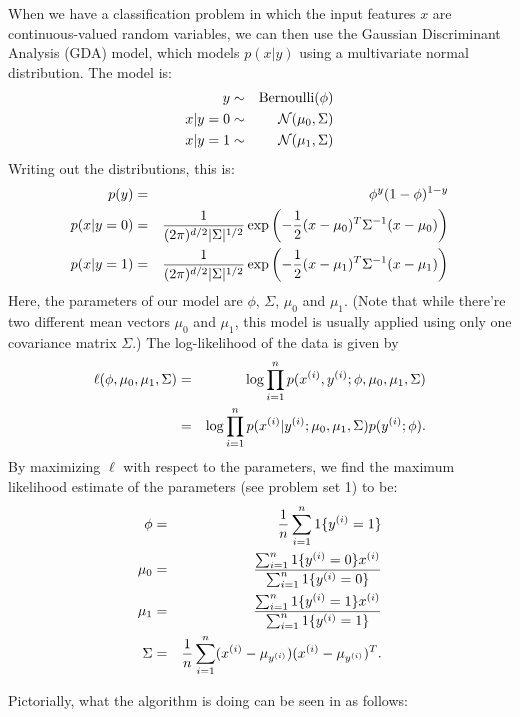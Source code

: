 \documentclass{article}
\begin{document}
When we have a classification problem in which the input features $x$ are continuous-valued
random variables, we can then use the Gaussian Discriminant Analysis (GDA) model, which
models $p(x|y)$ using a multivariate normal distribution.  The model is:
\begin{eqnarray*}
y &\sim& {\rm Bernoulli}(\phi)\\
x|y=0 &\sim& {\cal N}(\mu_0, \Sigma) \\
x|y=1 &\sim& {\cal N}(\mu_1, \Sigma) \\
\end{eqnarray*}
Writing out the distributions, this is:
\begin{eqnarray*}
p(y) &=& \phi^{y} (1-\phi)^{1-y} \\
p(x | y=0) &=& \frac{1}{(2\pi)^{{d}/2} |\Sigma|^{1/2}} \exp\left(-\frac{1}{2}
                 (x-\mu_0)^T \Sigma^{-1} (x-\mu_0) \right) \\
p(x | y=1) &=& \frac{1}{(2\pi)^{{d}/2} |\Sigma|^{1/2}} \exp\left(-\frac{1}{2}
                 (x-\mu_1)^T \Sigma^{-1} (x-\mu_1) \right) \\
\end{eqnarray*}
Here, the parameters of our model are $\phi$,
$\Sigma$, $\mu_0$ and $\mu_1$.
(Note that while there're two different mean vectors $\mu_0$ and $\mu_1$,
this model is usually applied using only one covariance matrix $\Sigma$.)
The log-likelihood of the data is given by
\begin{eqnarray*}
\ell(\phi, \mu_0, \mu_1, \Sigma) &=& \log \prod_{i=1}^{n} p(x^{(i)} , y^{(i)}; \phi, \mu_0, \mu_1, \Sigma) \\
&=& \log \prod_{i=1}^{n} p(x^{(i)} | y^{(i)}; \mu_0, \mu_1, \Sigma) p(y^{(i)}; \phi).
\end{eqnarray*}
By maximizing $\ell$ with respect to the parameters, we find the maximum likelihood
estimate of the parameters (see problem set 1) to be:
\begin{eqnarray*}
\phi &=& \frac{1}{{n}} \sum_{i=1}^{n} 1\{y^{(i)} = 1\} \\
\mu_0 &=& \frac{\sum_{i=1}^{n} 1\{y^{(i)} = 0\} x^{(i)}}{\sum_{i=1}^{n} 1\{y^{(i)} = 0\}} \\
\mu_1 &=& \frac{\sum_{i=1}^{n} 1\{y^{(i)} = 1\} x^{(i)}}{\sum_{i=1}^{n} 1\{y^{(i)} = 1\}} \\
\Sigma &=& \frac{1}{{n}} \sum_{i=1}^{n} (x^{(i)} - \mu_{y^{(i)}}) (x^{(i)} - \mu_{y^{(i)}})^T.
\end{eqnarray*}

Pictorially, what the algorithm is doing can be seen in as follows:
\end{document}
